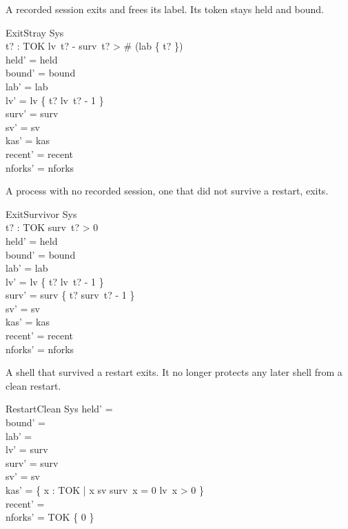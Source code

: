 \documentclass[a4paper,10pt,fleqn]{article}
\begin{document}
A recorded session exits and frees its label. Its token stays held and bound.

\begin{schema}{ExitStray}
  \Delta Sys \\
  t? : TOK
\where
  lv~t? - surv~t? > \# (lab \rres \{ t? \}) \\
  held' = held \\
  bound' = bound \\
  lab' = lab \\
  lv' = lv \oplus \{ t? \mapsto lv~t? - 1 \} \\
  surv' = surv \\
  sv' = sv \\
  kas' = kas \\
  recent' = recent \\
  nforks' = nforks
\end{schema}

A process with no recorded session, one that did not survive a restart, exits.

\begin{schema}{ExitSurvivor}
  \Delta Sys \\
  t? : TOK
\where
  surv~t? > 0 \\
  held' = held \\
  bound' = bound \\
  lab' = lab \\
  lv' = lv \oplus \{ t? \mapsto lv~t? - 1 \} \\
  surv' = surv \oplus \{ t? \mapsto surv~t? - 1 \} \\
  sv' = sv \\
  kas' = kas \\
  recent' = recent \\
  nforks' = nforks
\end{schema}

A shell that survived a restart exits. It no longer protects any later shell from a clean restart.

\begin{schema}{RestartClean}
  \Delta Sys
\where
  held' = \emptyset \\
  bound' = \emptyset \\
  lab' = \emptyset \\
  lv' = surv \\
  surv' = surv \\
  sv' = sv \\
  kas' = \{ x : TOK | x \in sv \land surv~x = 0 \land lv~x > 0 \} \\
  recent' = \langle \rangle \\
  nforks' = TOK \cross \{ 0 \}
\end{schema}
\end{document}
